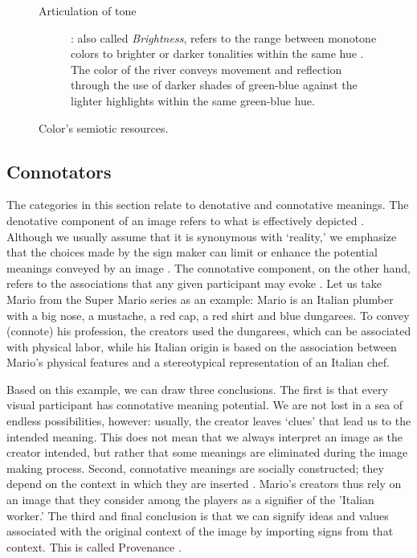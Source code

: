 \documentclass[english]{textolivre}
\begin{document}
\begin{figure}[htbp]
\begin{minipage}[t]{\textwidth}
\begin{description}
    \item[Articulation of tone]: also called \textit{Brightness}, refers to the range between monotone colors to brighter or darker tonalities within the same hue \cites[p. 167]{van_leeuwen_introducing_2005}. The color of the river conveys movement and reflection through the use of darker shades of green-blue against the lighter highlights within the same green-blue hue.
\end{description}
\end{minipage}
\caption{Color’s semiotic resources.}
\label{chart1}
\end{figure}

\subsection{Connotators}\label{sec-modelo}
The categories in this section relate to denotative and connotative meanings. The denotative component of an image refers to what is effectively depicted \cite[p. 23]{ledin_introduction_2007}. Although we usually assume that it is synonymous with ‘reality,’ we emphasize that the choices made by the sign maker can limit or enhance the potential meanings conveyed by an image \textcite[p. 23]{ledin_introduction_2007}. The connotative component, on the other hand, refers to the associations that any given participant may evoke \cite[p. 219]{machin_how_2012}. Let us take Mario from the Super Mario series as an example: Mario is an Italian plumber with a big nose, a mustache, a red cap, a red shirt and blue dungarees. To convey (connote) his profession, the creators used the dungarees, which can be associated with physical labor, while his Italian origin is based on the association between Mario's physical features and a stereotypical representation of an Italian chef.

Based on this example, we can draw three conclusions. The first is that every visual participant has connotative meaning potential. We are not lost in a sea of endless possibilities, however: usually, the creator leaves ‘clues’ that lead us to the intended meaning. This does not mean that we always interpret an image as the creator intended, but rather that some meanings are eliminated during the image making process. Second, connotative meanings are socially constructed; they depend on the context in which they are inserted \cite[p. 219]{machin_how_2012}. Mario's creators thus rely on an image that they consider among the players as a signifier of the 'Italian worker.' The third and final conclusion is that we can signify ideas and values associated with the original context of the image by importing signs from that context. This is called Provenance \cite[p. 10]{kress_multimodal_2001}.
\end{document}
